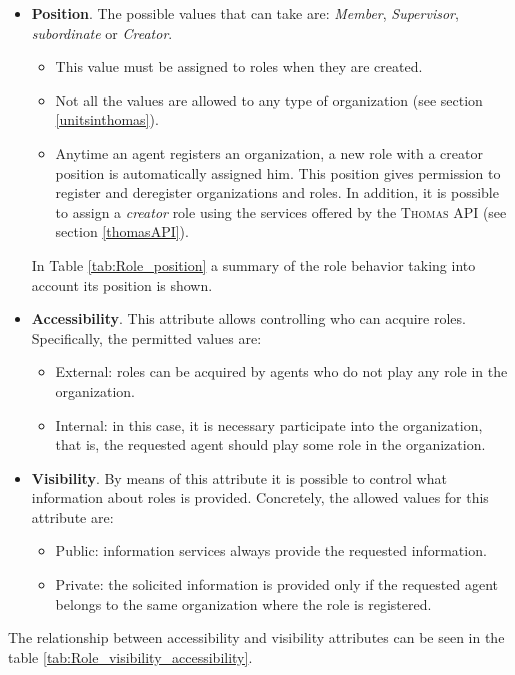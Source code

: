 \begin{itemize}
\item \textbf{Position}. The possible values that can take are: \textit{Member}, \textit{Supervisor}, \textit{subordinate} or \textit{Creator}. 
\begin{itemize}
\item This value must be assigned to roles when they are created. 
\item Not all the values are allowed to any type of organization (see section \ref{unitsinthomas}).
\item Anytime an agent registers an organization, a new role with a creator position is automatically assigned him. This position gives permission to register and deregister organizations and roles. In addition, it is possible to assign a \textit{creator} role using the services offered by the \textsc{Thomas} API (see section \ref{thomasAPI}).
\end{itemize}

In Table \ref{tab:Role_position} a summary of the role behavior taking into account its position is shown.


\item \textbf{Accessibility}. This attribute allows controlling who can acquire roles. Specifically, the permitted values are:
\begin{itemize}
	\item External: roles can be acquired by agents who do not play any role in the organization.   
	\item Internal: in this case, it is necessary participate into the organization, that is, the requested agent should play some role  in the organization.
\end{itemize}


\item \textbf{Visibility}. By means of this attribute it is possible to control what information about roles is provided. Concretely, the allowed values for this attribute are: 
\begin{itemize}
\item Public: information services always provide the requested information. 
\item Private: the solicited information is provided only if the requested  agent belongs to the same organization where the role is registered.
\end{itemize}

\end{itemize}

 The relationship between accessibility and visibility attributes  can be seen in the table \ref{tab:Role_visibility_accessibility}.


